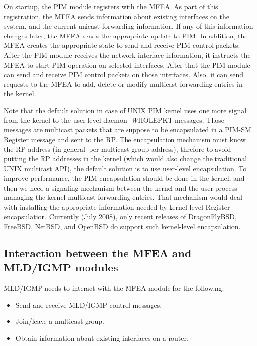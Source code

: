 \documentclass[11pt]{article}
\begin{document}
On startup, the PIM module registers with the MFEA. As part of this
registration, the MFEA sends information about existing
interfaces on the system, and the current unicast forwarding
information. If any of this information changes later, the MFEA sends
the appropriate update to PIM. In addition, the MFEA creates the
appropriate state to send and receive PIM control packets. After the
PIM module receives the network interface information, it instructs the
MFEA to start PIM operation on selected interfaces. After that the PIM
module can send and receive PIM control packets on those interfaces.
Also, it can send requests to the MFEA to add, delete or modify multicast
forwarding entries in the kernel.

Note that the default solution in case of UNIX PIM kernel
uses one more signal from the kernel to the user-level daemon:
{\emph WHOLEPKT} messages. Those messages are multicast packets that are
suppose to be encapsulated in a PIM-SM Register message and sent to the
RP. The encapsulation mechanism must know the RP address (in general,
per multicast group address), threfore to avoid putting the RP addresses in
the kernel (which would also change the traditional UNIX multicast API), the
default solution is to use user-level encapsulation.  To improve
performance, the PIM encapsulation should be done in the kernel, and
then we need a signaling mechanism between the kernel and the user
process managing the kernel multicast forwarding entries. That mechanism
would deal with installing the appropriate information needed by kernel-level
Register encapsulation. Currently (July 2008), only recent releases
of DragonFlyBSD, FreeBSD, NetBSD, and OpenBSD do support such
kernel-level encapsulation.

\subsection{Interaction between the MFEA and MLD/IGMP modules}

MLD/IGMP needs to interact with the MFEA module for the following:

\begin{itemize}

  \item Send and receive MLD/IGMP control messages.

  \item Join/leave a multicast group.

  \item Obtain information about existing interfaces on a router.

\end{itemize}
\end{document}

